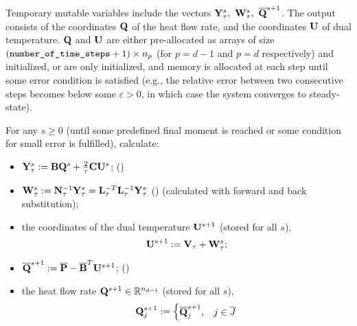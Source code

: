 \begin{algorithm}
\begin{enumerate}
      Temporary mutable variables include the vectors
      ${\bf Y}_\tau^s,\ {\bf W}_\tau^s,\ \overline{\bf Q}^{s + 1}$.
      The output consists of the coordinates ${\bf Q}$ of the heat flow rate,
      and the coordinates ${\bf U}$ of dual temperature.
      ${\bf Q}$ and ${\bf U}$ are either pre-allocated as arrays of size
      $(\verb|number_of_time_steps| + 1) \times n_p$
      (for $p = d - 1$ and $p = d$ respectively) and initialized,
      or are only initialized, and memory is allocated at each step until some
      error condition is satisfied
      (e.g., the relative error between two consecutive steps becomes below some
      $\varepsilon > 0$, in which case the system converges to steady-state).

      For any $s \geq 0$ (until some predefined final moment is reached or some
      condition for small error is fulfilled), calculate:
      \begin{itemize}
        \item
          \qquad\;
          $ {\bf Y}_\tau^s
            := {\bf B} {\bf Q}^s + \frac{2}{\tau} {\bf C} {\bf U}^s$;
          \hfill{}\textup{(\theequation)}
        \item
          \qquad\;
          $ {\bf W}_\tau^s
            := {\bf N}_\tau^{-1} {\bf Y}_\tau^s
            = {\bf L}_\tau^{-T} {\bf L}_\tau^{-1} {\bf Y}_\tau^s$
          \hfill{}\textup{(\theequation)}
          \newline
          (calculated with forward and back substitution);
        \item
          the coordinates of the dual temperature ${\bf U}^{s + 1}$
          (stored for all $s$),
          \begin{equation}
            {\bf U}^{s + 1} := {\bf V}_\tau + {\bf W}_\tau^s;
          \end{equation}
        \item
          \qquad\;
          $ \overline{\bf Q}^{s + 1}
            := \overline{\bf P} - \overline{\bf B}^T {\bf U}^{s + 1}$;
          \hfill{}\textup{(\theequation)}
        \item
          the heat flow rate ${\bf Q}^{s + 1} \in \mathbb{R}^{n_{d - 1}}$
          (stored for all $s$),
          \begin{equation}
            {\bf Q}^{s + 1}_j :=
            \begin{cases}
              \overline{\bf Q}^{s + 1}_j, & j \in \overline{J} \\

\end{cases}
\end{equation}
\end{itemize}
\end{enumerate}
\end{algorithm}
